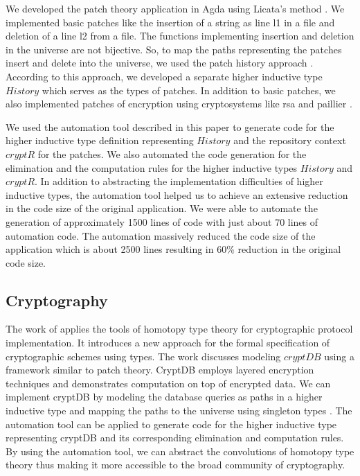 \documentclass[sigplan,10pt]{acmart}
\begin{document}
We developed the patch theory application in Agda using Licata's method \cite{Licata-2011}. We implemented basic patches like the insertion of a string as line l1 in a file and deletion of a line l2 from a file. The functions implementing insertion and deletion in the universe are not bijective. So, to map the paths representing the patches insert and delete into the universe, we used the patch history approach \cite{Angiuli-2014}. According to this approach, we developed a separate higher inductive type $History$ which serves as the types of patches. In addition to basic patches, we also implemented patches of encryption using cryptosystems like rsa \cite{Rivest-1978} and paillier \cite{Paillier-1999}.

We used the automation tool described in this paper to generate code for the higher inductive type definition representing $History$ and the repository context $cryptR$ for the patches. We also automated the code generation for the elimination and the computation rules for the higher inductive types $History$ and $cryptR$. In addition to abstracting the implementation difficulties of higher inductive types, the automation tool helped us to achieve an extensive reduction in the code size of the original application. We were able to automate the generation of approximately 1500 lines of code with just about 70 lines of automation code. The automation massively reduced the code size of the application which is about 2500 lines resulting in 60\% reduction in the original code size.

\subsection{Cryptography}
\label{crypto}

The work of \cite{Paventhan-2018} applies the tools of homotopy type theory for cryptographic protocol implementation. It introduces a new approach for the formal specification of cryptographic schemes using types. The work discusses modeling $cryptDB$ \citep{Popa-2011} using a framework similar to patch theory. CryptDB employs layered encryption techniques and demonstrates computation on top of encrypted data. We can implement cryptDB by modeling the database queries as paths in a higher inductive type and mapping the paths to the universe using singleton types \cite{Angiuli-2014}. The automation tool can be applied to generate code for the higher inductive type representing cryptDB and its corresponding elimination and computation rules. By using the automation tool, we can abstract the convolutions of homotopy type theory thus making it more accessible to the broad community of cryptography.
\end{document}
